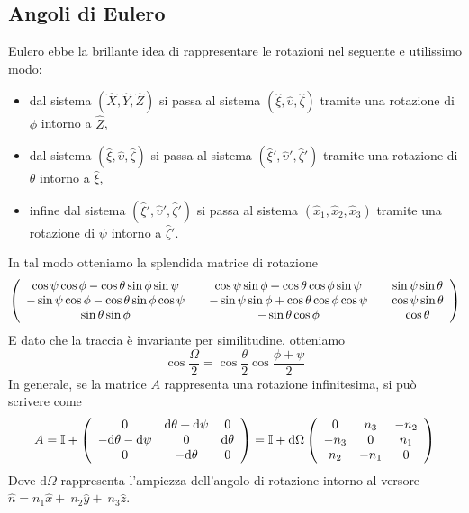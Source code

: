 \documentclass[a4paper,11pt]{article}
\begin{document}
\subsection{Angoli di Eulero}
Eulero ebbe la brillante idea di rappresentare le rotazioni nel seguente e utilissimo modo:
\begin{itemize}
	\item dal sistema $(\hat{X},\hat{Y},\hat{Z})$ si passa al sistema $(\hat{\xi},\hat{\upsilon},\hat{\zeta})$ tramite una rotazione di $\phi$ intorno a $\hat{Z}$,
	\item dal sistema $(\hat{\xi},\hat{\upsilon},\hat{\zeta})$ si passa al sistema $(\hat{\xi}',\hat{\upsilon}',\hat{\zeta}')$ tramite una rotazione di $\theta$ intorno a $\hat{\xi}$,
	\item infine dal sistema $(\hat{\xi}',\hat{\upsilon}',\hat{\zeta}')$ si passa al sistema $(\hat{x}_1,\hat{x}_2,\hat{x}_3)$ tramite una rotazione di $\psi$ intorno a $\hat{\zeta}'$.
\end{itemize}
\vspace{5mm}
In tal modo otteniamo la splendida matrice di rotazione
$$\left(\begin{array}{c c c c c}
\cos\psi\cos\phi-\cos\theta\sin\phi\sin\psi && \cos\psi\sin\phi+\cos\theta\cos\phi\sin\psi && \sin\psi\sin\theta \\
-\sin\psi\cos\phi-\cos\theta\sin\phi\cos\psi && -\sin\psi\sin\phi+\cos\theta\cos\phi\cos\psi && \cos\psi\sin\theta \\
\sin\theta\sin\phi && -\sin\theta\cos\phi && \cos\theta \\
\end{array}\right)$$
E dato che la traccia è invariante per similitudine, otteniamo 
$$\cos\frac{\Omega}{2}=\cos\frac{\theta}{2}\cos\frac{\phi+\psi}{2}$$
In generale, se la matrice $A$ rappresenta una rotazione infinitesima, si può scrivere come
\[A=\mathbb{I}+\left(\begin{array}{c c c}
0 & \mathrm{d}\theta+\mathrm{d}\psi & 0 \\
-\mathrm{d}\theta-\mathrm{d}\psi & 0 & \mathrm{d}\theta \\
0 & -\mathrm{d}\theta & 0 
\end{array}\right)=\mathbb{I}+\mathrm{d}\Omega\left(\begin{array}{c c c}
0 & n_3 & -n_2 \\
-n_3 & 0 & n_1 \\
n_2 & -n_1 & 0 
\end{array}\right)\]
Dove $\mathrm{d}\Omega$ rappresenta l'ampiezza dell'angolo di rotazione intorno al versore $\hat{n}=n_1\hat{x}+~n_2\hat{y}+~n_3\hat{z}$. 
\end{document}
